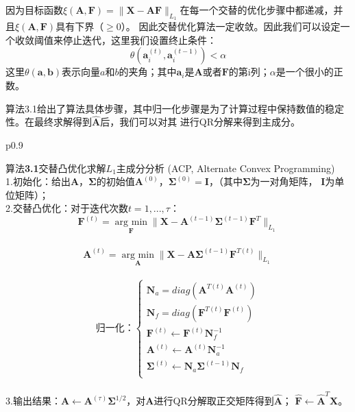 因为目标函数$\xi (\bm{A},\bm F) = \|\bm X - \bm{A}\bm{F}\|_{L_1}$在每一个交替的优化步骤中都递减，并且$\xi( \bm{A},\bm F)$具有下界（$\geq 0$）。
因此交替优化算法一定收敛。因此我们可以设定一个收敛阈值来停止迭代，这里我们设置终止条件：
    $$ \theta(\bm a_i^{(t)}, \bm a_i^{(t-1)}) <  \alpha $$
这里$\theta(\bm a, \bm b)$表示向量$a$和$b$的夹角；其中$\bm a_i$是$\bm{A}$或者$\bm F$的第i列；$\alpha$是一个很小的正数。

算法3.1给出了算法具体步骤，其中归一化步骤是为了计算过程中保持数值的稳定性。在最终求解得到$\hat {\bm{A}}$后，我们可以对其
进行QR分解来得到主成分。

\begin{table}[H]%
    \centering%
    \begin{tabular}{{p{0.9\columnwidth}}}%
    
    \toprule%
    {\heiti 算法}{\bf 3.1}交替凸优化求解$L_1$主成分分析 (ACP, Alternate Convex Programming) \\
    \midrule%
    1.初始化：给出$\bm{A}$，$\bm \Sigma$的初始值$\bm{A}^{(0)}$，$\bm \Sigma^{(0)} = \bm I$，（其中$\bm \Sigma$为一对角矩阵，
    $\bm I$为单位矩阵）； \\

    2.交替凸优化：对于迭代次数$t = 1, ..., \tau$： \\
    $$ \bm F^{(t)} = \underset{\bm F}{\operatorname{arg\ min}} \|\bm X - \bm{A}^{(t-1)}\bm\Sigma^{(t-1)}\bm F^{T}\|_{L_1}$$ \\
    $$ \bm{A}^{(t)} = \underset{\bm{A}}{\operatorname{arg\ min}} \|\bm X - \bm{A}\bm\Sigma^{(t-1)}\bm F^{T(t)} \|_{L_1}$$ \\
    \begin{equation*}
        \text{归一化：}\left\{
                    \begin{array}{clr}
                    \bm N_a = diag(\bm{A}^{T(t)}\bm{A}^{(t)})\\
                    \bm N_f = diag(\bm F^{T(t)}\bm F^{(t)})\\
                    \bm F^{(t)} \leftarrow \bm F^{(t)}\bm N_f^{-1}\\
                    \bm{A}^{(t)}\leftarrow \bm{A}^{(t)}\bm N_a^{-1}\\
                    \bm \Sigma^{(t)} \leftarrow \bm N_a\bm \Sigma^{(t-1)}\bm N_f\\
                    \end{array}
        \right.
    \end{equation*} \\

    3.输出结果：$\bm{A} \leftarrow \bm{A}^{(\tau)}\bm \Sigma^{1/2}$，对$\bm{A}$进行QR分解取正交矩阵得到$\hat{\bm{A}}$；
    $\hat{\bm{F}} \leftarrow \hat{\bm{A}}^T\bm{X}$。 \\
    \bottomrule%
    \end{tabular}
\end{table}%


